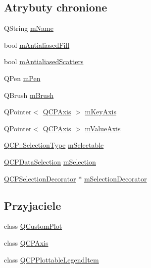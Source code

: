 \subsection*{Atrybuty chronione}
\begin{DoxyCompactItemize}
\item 
Q\+String \hyperlink{class_q_c_p_abstract_plottable_ac29ffef424e2488675930de18cde612a}{m\+Name}
\item 
bool \hyperlink{class_q_c_p_abstract_plottable_a152ac765bedf927fb240545d11d453ea}{m\+Antialiased\+Fill}
\item 
bool \hyperlink{class_q_c_p_abstract_plottable_aa115755e525a8e3a86dc683f9cab755b}{m\+Antialiased\+Scatters}
\item 
Q\+Pen \hyperlink{class_q_c_p_abstract_plottable_a67bc0622fd1b9fa14e54c14922dcec66}{m\+Pen}
\item 
Q\+Brush \hyperlink{class_q_c_p_abstract_plottable_a33f00674c0161c13315ab9da0895418e}{m\+Brush}
\item 
Q\+Pointer$<$ \hyperlink{class_q_c_p_axis}{Q\+C\+P\+Axis} $>$ \hyperlink{class_q_c_p_abstract_plottable_a426f42e254d0f8ce5436a868c61a6827}{m\+Key\+Axis}
\item 
Q\+Pointer$<$ \hyperlink{class_q_c_p_axis}{Q\+C\+P\+Axis} $>$ \hyperlink{class_q_c_p_abstract_plottable_a2901452ca4aea911a1827717934a4bda}{m\+Value\+Axis}
\item 
\hyperlink{namespace_q_c_p_ac6cb9db26a564b27feda362a438db038}{Q\+C\+P\+::\+Selection\+Type} \hyperlink{class_q_c_p_abstract_plottable_a3944521f7bec90974737c9d192fc57ba}{m\+Selectable}
\item 
\hyperlink{class_q_c_p_data_selection}{Q\+C\+P\+Data\+Selection} \hyperlink{class_q_c_p_abstract_plottable_a206aa62c9eba32c82e892b29cdbf6314}{m\+Selection}
\item 
\hyperlink{class_q_c_p_selection_decorator}{Q\+C\+P\+Selection\+Decorator} $\ast$ \hyperlink{class_q_c_p_abstract_plottable_a0dbc731cab717f4ff67b4ca100c74046}{m\+Selection\+Decorator}
\end{DoxyCompactItemize}
\subsection*{Przyjaciele}
\begin{DoxyCompactItemize}
\item 
class \hyperlink{class_q_c_p_abstract_plottable_a1cdf9df76adcfae45261690aa0ca2198}{Q\+Custom\+Plot}
\item 
class \hyperlink{class_q_c_p_abstract_plottable_af123edeca169ec7a31958a1d714e1a8a}{Q\+C\+P\+Axis}
\item 
class \hyperlink{class_q_c_p_abstract_plottable_a104c78e91302afd6842a903e472f552f}{Q\+C\+P\+Plottable\+Legend\+Item}
\end{DoxyCompactItemize}


